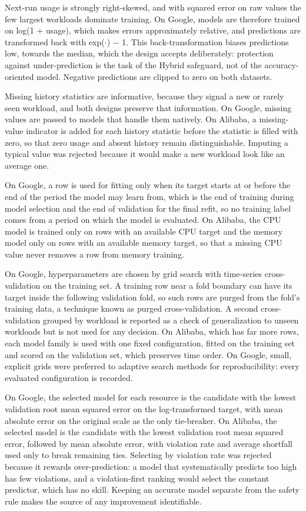 \documentclass{IEEEtran}
\begin{document}
Next-run usage is strongly right-skewed, and with squared error on raw values the few largest workloads dominate training. On Google, models are therefore trained on log(1 + usage), which makes errors approximately relative, and predictions are transformed back with exp($\cdot$) $-$ 1. This back-transformation biases predictions low, towards the median, which the design accepts deliberately: protection against under-prediction is the task of the Hybrid safeguard, not of the accuracy-oriented model. Negative predictions are clipped to zero on both datasets.

Missing history statistics are informative, because they signal a new or rarely seen workload, and both designs preserve that information. On Google, missing values are passed to models that handle them natively. On Alibaba, a missing-value indicator is added for each history statistic before the statistic is filled with zero, so that zero usage and absent history remain distinguishable. Imputing a typical value was rejected because it would make a new workload look like an average one.

On Google, a row is used for fitting only when its target starts at or before the end of the period the model may learn from, which is the end of training during model selection and the end of validation for the final refit, so no training label comes from a period on which the model is evaluated. On Alibaba, the CPU model is trained only on rows with an available CPU target and the memory model only on rows with an available memory target, so that a missing CPU value never removes a row from memory training.

On Google, hyperparameters are chosen by grid search with time-series cross-validation on the training set. A training row near a fold boundary can have its target inside the following validation fold, so such rows are purged from the fold's training data, a technique known as purged cross-validation. A second cross-validation grouped by workload is reported as a check of generalization to unseen workloads but is not used for any decision. On Alibaba, which has far more rows, each model family is used with one fixed configuration, fitted on the training set and scored on the validation set, which preserves time order. On Google, small, explicit grids were preferred to adaptive search methods for reproducibility: every evaluated configuration is recorded.

On Google, the selected model for each resource is the candidate with the lowest validation root mean squared error on the log-transformed target, with mean absolute error on the original scale as the only tie-breaker. On Alibaba, the selected model is the candidate with the lowest validation root mean squared error, followed by mean absolute error, with violation rate and average shortfall used only to break remaining ties. Selecting by violation rate was rejected because it rewards over-prediction: a model that systematically predicts too high has few violations, and a violation-first ranking would select the constant predictor, which has no skill. Keeping an accurate model separate from the safety rule makes the source of any improvement identifiable.
\end{document}
